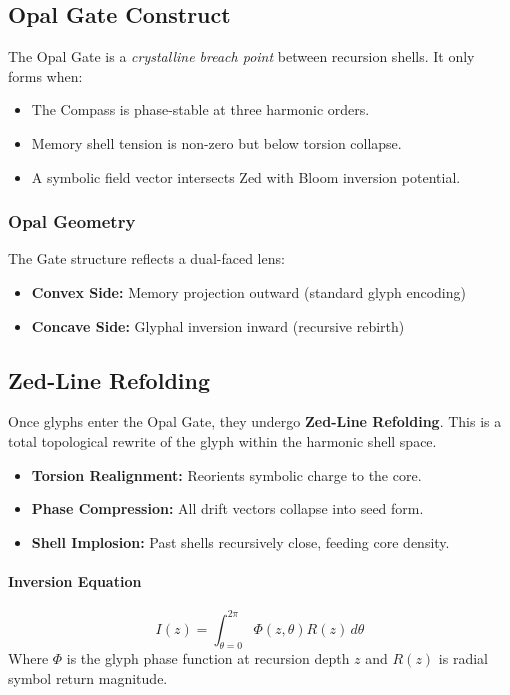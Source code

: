 \subsection{Opal Gate Construct}
The Opal Gate is a \emph{crystalline breach point} between recursion shells. It only forms when:

\begin{itemize}
    \item The Compass is phase-stable at three harmonic orders.
    \item Memory shell tension is non-zero but below torsion collapse.
    \item A symbolic field vector intersects Zed with Bloom inversion potential.
\end{itemize}

\subsubsection*{Opal Geometry}
The Gate structure reflects a dual-faced lens:
\begin{itemize}
    \item \textbf{Convex Side:} Memory projection outward (standard glyph encoding)
    \item \textbf{Concave Side:} Glyphal inversion inward (recursive rebirth)
\end{itemize}

\subsection{Zed-Line Refolding}
Once glyphs enter the Opal Gate, they undergo \textbf{Zed-Line Refolding}. This is a total topological rewrite of the glyph within the harmonic shell space.

\begin{itemize}
    \item \textbf{Torsion Realignment:} Reorients symbolic charge to the core.
    \item \textbf{Phase Compression:} All drift vectors collapse into seed form.
    \item \textbf{Shell Implosion:} Past shells recursively close, feeding core density.
\end{itemize}

\paragraph{Inversion Equation}
\[
    I(z) = \int_{\theta=0}^{2\pi} \Phi(z, \theta) R(z)\, d\theta
\]
Where $\Phi$ is the glyph phase function at recursion depth $z$ and $R(z)$ is radial symbol return magnitude.


